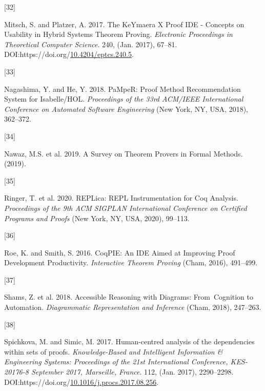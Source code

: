\documentclass[
]{article}
\newlength{\cslhangindent}
\newlength{\csllabelwidth}
\newlength{\cslentryspacingunit} %
\newenvironment{CSLReferences}[2] %
 {%
  \setlength{\parindent}{0pt}
  \ifodd #1
  \let\oldpar\par
  \def\par{\hangindent=\cslhangindent\oldpar}
  \fi
  \setlength{\parskip}{#2\cslentryspacingunit}
 }%
 {}
\newcommand{\CSLLeftMargin}[1]{\parbox[t]{\csllabelwidth}{#1}}
\newcommand{\CSLRightInline}[1]{\parbox[t]{\linewidth - \csllabelwidth}{#1}\break}
\begin{document}
\begin{CSLReferences}{0}{0}
\leavevmode{}%
\CSLLeftMargin{{[}32{]} }
\CSLRightInline{Mitsch, S. and Platzer, A. 2017. The {KeYmaera} {X}
{Proof} {IDE} - {Concepts} on {Usability} in {Hybrid} {Systems}
{Theorem} {Proving}. \emph{Electronic Proceedings in Theoretical
Computer Science}. 240, (Jan. 2017), 67--81.
DOI:https://doi.org/\href{https://doi.org/10.4204/eptcs.240.5}{10.4204/eptcs.240.5}.}

\leavevmode{}%
\CSLLeftMargin{{[}33{]} }
\CSLRightInline{Nagashima, Y. and He, Y. 2018. {PaMpeR}: {Proof}
{Method} {Recommendation} {System} for {Isabelle}/{HOL}.
\emph{Proceedings of the 33rd {ACM}/{IEEE} {International} {Conference}
on {Automated} {Software} {Engineering}} (New York, NY, USA, 2018),
362--372.}

\leavevmode{}%
\CSLLeftMargin{{[}34{]} }
\CSLRightInline{Nawaz, M.S. et al. 2019. A {Survey} on {Theorem}
{Provers} in {Formal} {Methods}. (2019).}

\leavevmode{}%
\CSLLeftMargin{{[}35{]} }
\CSLRightInline{Ringer, T. et al. 2020. {REPLica}: {REPL}
{Instrumentation} for {Coq} {Analysis}. \emph{Proceedings of the 9th
{ACM} {SIGPLAN} {International} {Conference} on {Certified} {Programs}
and {Proofs}} (New York, NY, USA, 2020), 99--113.}

\leavevmode{}%
\CSLLeftMargin{{[}36{]} }
\CSLRightInline{Roe, K. and Smith, S. 2016. {CoqPIE}: {An} {IDE} {Aimed}
at {Improving} {Proof} {Development} {Productivity}. \emph{Interactive
{Theorem} {Proving}} (Cham, 2016), 491--499.}

\leavevmode{}%
\CSLLeftMargin{{[}37{]} }
\CSLRightInline{Shams, Z. et al. 2018. Accessible {Reasoning} with
{Diagrams}: {From}~{Cognition} to {Automation}. \emph{Diagrammatic
{Representation} and {Inference}} (Cham, 2018), 247--263.}

\leavevmode{}%
\CSLLeftMargin{{[}38{]} }
\CSLRightInline{Spichkova, M. and Simic, M. 2017. Human-centred analysis
of the dependencies within sets of proofs. \emph{Knowledge-Based and
Intelligent Information \& Engineering Systems: Proceedings of the 21st
International Conference, KES-20176-8 September 2017, Marseille,
France}. 112, (Jan. 2017), 2290--2298.
DOI:https://doi.org/\href{https://doi.org/10.1016/j.procs.2017.08.256}{10.1016/j.procs.2017.08.256}.}


\end{CSLReferences}
\end{document}
